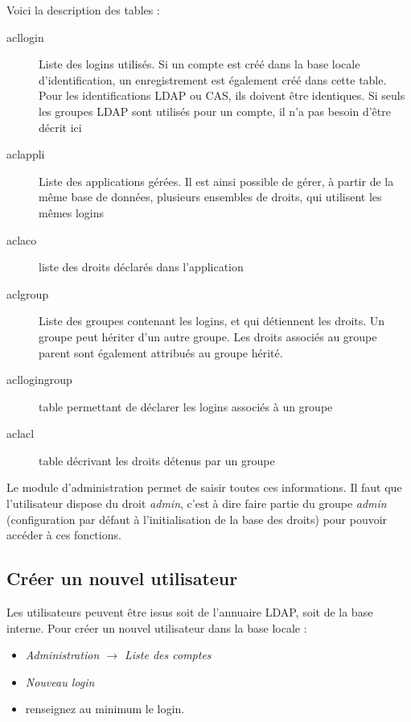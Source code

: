 Voici la description des tables :
\begin{description}
\item[acllogin] Liste des logins utilisés. Si un compte est créé dans la base locale d'identification, un enregistrement est également créé dans cette table. Pour les identifications LDAP ou CAS, ils doivent être identiques. Si seuls les groupes LDAP sont utilisés pour un compte, il n'a pas besoin d'être décrit ici
\item[aclappli] Liste des applications gérées. Il est ainsi possible de gérer, à partir de la même base de données, plusieurs ensembles de droits, qui utilisent les mêmes logins
\item[aclaco] liste des droits déclarés dans l'application
\item[aclgroup] Liste des groupes contenant les logins, et qui détiennent les droits. Un groupe peut hériter d'un autre groupe. Les droits associés au groupe parent sont également attribués au groupe hérité.
\item[acllogingroup] table permettant de déclarer les logins associés à un groupe
\item[aclacl] table décrivant les droits détenus par un groupe
\end{description}

Le module d'administration permet de saisir toutes ces informations. Il faut que l'utilisateur dispose du droit \textit{admin}, c'est à dire faire partie du groupe \textit{admin} (configuration par défaut à l'initialisation de la base des droits) pour pouvoir accéder à ces fonctions.

\subsection{Créer un nouvel utilisateur}

Les utilisateurs peuvent être issus soit de l'annuaire LDAP, soit de la base interne. 
Pour créer un nouvel utilisateur dans la base locale :
\begin{itemize}
\item \textit{Administration $\rightarrow$ Liste des comptes }
\item \textit{Nouveau login}
\item renseignez au minimum le login.
\end{itemize}

